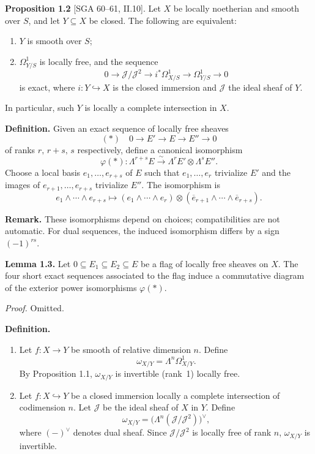 \setcounter{page}{139}
\textbf{Proposition 1.2} [SGA 60--61, II.10].
Let $X$ be locally noetherian and smooth over $S$, and let $Y\subseteq X$ be closed.
The following are equivalent:
\begin{enumerate}
\item[(i)] $Y$ is smooth over $S$;
\item[(ii)] $\Omega^1_{Y/S}$ is locally free, and the sequence
\[
0 \to \mathcal{J}/\mathcal{J}^2 \to i^*\Omega^1_{X/S} \to \Omega^1_{Y/S} \to 0
\]
is exact, where $i\colon Y\hookrightarrow X$ is the closed immersion and $\mathcal{J}$ the ideal sheaf of $Y$.
\end{enumerate}
In particular, such $Y$ is locally a complete intersection in $X$.

\textbf{Definition.}
Given an exact sequence of locally free sheaves
\[
(*) \quad 0\to E'\to E\to E''\to 0
\]
of ranks $r,\,r+s,\,s$ respectively, define a canonical isomorphism
\[
\varphi(*)\colon \Lambda^{r+s}E \xrightarrow{\sim} \Lambda^r E' \otimes \Lambda^s E''.
\]
Choose a local basis $e_1,\dots,e_{r+s}$ of $E$ such that $e_1,\dots,e_r$ trivialize $E'$ and the images of $e_{r+1},\dots,e_{r+s}$ trivialize $E''$. The isomorphism is
\[
e_1\wedge\cdots\wedge e_{r+s}
\mapsto
(e_1\wedge\cdots\wedge e_r)\otimes (\overline{e}_{r+1}\wedge\cdots\wedge\overline{e}_{r+s}).
\]

\setcounter{page}{140}
\textbf{Remark.}
These isomorphisms depend on choices; compatibilities are not automatic. For dual sequences, the induced isomorphism differs by a sign $(-1)^{rs}$.

\textbf{Lemma 1.3.}
Let $0\subseteq E_1\subseteq E_2\subseteq E$ be a flag of locally free sheaves on $X$.
The four short exact sequences associated to the flag induce a commutative diagram of the exterior power isomorphisms $\varphi(*)$.

\textit{Proof.} Omitted.

\setcounter{page}{141}
\textbf{Definition.}
\begin{enumerate}
\item[(a)] Let $f\colon X\to Y$ be smooth of relative dimension $n$. Define
\[
\omega_{X/Y} = \Lambda^n \Omega^1_{X/Y}.
\]
By Proposition 1.1, $\omega_{X/Y}$ is invertible (rank~1) locally free.

\item[(b)] Let $f\colon X\hookrightarrow Y$ be a closed immersion locally a complete intersection of codimension $n$. Let $\mathcal{J}$ be the ideal sheaf of $X$ in $Y$. Define
\[
\omega_{X/Y} = \big(\Lambda^n (\mathcal{J}/\mathcal{J}^2)\big)^\vee,
\]
where $(-)^\vee$ denotes dual sheaf. Since $\mathcal{J}/\mathcal{J}^2$ is locally free of rank $n$, $\omega_{X/Y}$ is invertible.
\end{enumerate}

